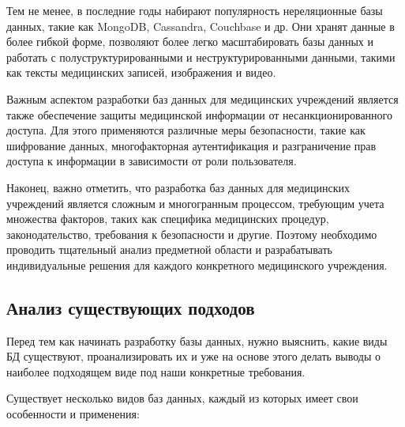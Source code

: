 Тем не менее, в последние годы набирают популярность нереляционные базы данных, такие как MongoDB, Cassandra, Couchbase и др. Они хранят данные в более гибкой форме, позволяют более легко масштабировать базы данных и работать с полуструктурированными и неструктурированными данными, такими как тексты медицинских записей, изображения и видео.

Важным аспектом разработки баз данных для медицинских учреждений является также обеспечение защиты медицинской информации от несанкционированного доступа. Для этого применяются различные меры безопасности, такие как шифрование данных, многофакторная аутентификация и разграничение прав доступа к информации в зависимости от роли пользователя.

Наконец, важно отметить, что разработка баз данных для медицинских учреждений является сложным и многогранным процессом, требующим учета множества факторов, таких как специфика медицинских процедур, законодательство, требования к безопасности и другие. Поэтому необходимо проводить тщательный анализ предметной области и разрабатывать индивидуальные решения для каждого конкретного медицинского учреждения.




\subsection{Анализ существующих подходов}

Перед тем как начинать разработку базы данных, нужно выяснить, какие виды БД существуют, проанализировать их и уже на основе этого делать выводы о наиболее подходящем виде под наши конкретные требования.

Существует несколько видов баз данных, каждый из которых имеет свои особенности и применения:

